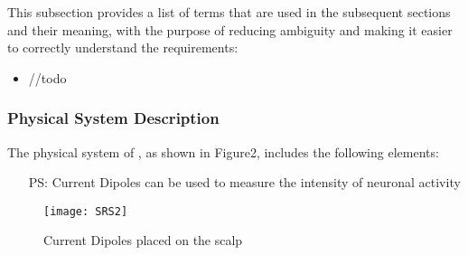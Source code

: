 \documentclass[12pt]{article}
\begin{document}
This subsection provides a list of terms that are used in the subsequent
sections and their meaning, with the purpose of reducing ambiguity and making it
easier to correctly understand the requirements:

\begin{itemize}

\item //todo
\end{itemize}

\subsubsection{Physical System Description} \label{sec_phySystDescrip}

%

The physical system of \progname{}, as shown in Figure2,
includes the following elements:

\begin{itemize}

\item[PS:] Current Dipoles can be used to measure the intensity of neuronal activity

\end{itemize}

 \begin{figure}[h!]
 \begin{center}
 {
  \texttt{[image: SRS2]}
 }
 \caption{Current Dipoles placed on the scalp}
 \end{center}
 \end{figure}
\end{document}
